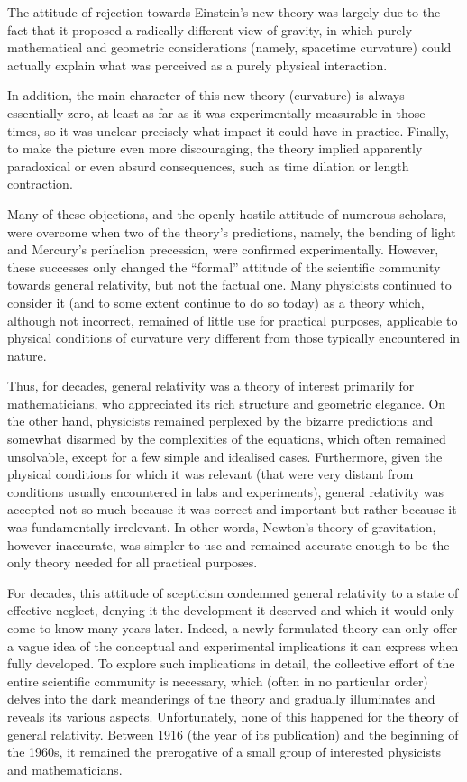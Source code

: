 The attitude of rejection towards Einstein's new theory was largely due to the fact that
it proposed a radically different view of gravity, in which purely mathematical and
geometric considerations (namely, spacetime curvature) could actually explain what was
perceived as a purely physical interaction.

In addition, the main character of this new theory (curvature) is always essentially
zero, at least as far as it was experimentally measurable in those times, so it was
unclear precisely what impact it could have in practice. Finally, to make the picture
even more discouraging, the theory implied apparently paradoxical or even absurd
consequences, such as time dilation or length contraction.

Many of these objections, and the openly hostile attitude of numerous scholars, were
overcome when two of the theory's predictions, namely, the bending of light and
Mercury's perihelion precession, were confirmed experimentally.
However, these successes only changed the ``formal'' attitude of the scientific
community towards general relativity, but not the factual one. Many physicists continued
to consider it (and to some extent continue to do so today) as a theory which, although
not incorrect, remained of little use for practical purposes, applicable to physical
conditions of curvature very different from those typically encountered in nature.

Thus, for decades, general relativity was a theory of interest primarily for
mathematicians, who appreciated its rich structure and geometric elegance. On the other
hand, physicists remained perplexed by the bizarre predictions and somewhat disarmed by
the complexities of the equations, which often remained unsolvable, except for a few
simple and idealised cases. Furthermore, given the physical conditions for which it was
relevant (that were very distant from conditions usually encountered in labs and
experiments), general relativity was accepted not so much because it was correct and
important but rather because it was fundamentally irrelevant. In other words, Newton's
theory of gravitation, however inaccurate, was simpler to use and remained accurate
enough to be the only theory needed for all practical purposes.

For decades, this attitude of scepticism condemned general relativity to a state of
effective neglect, denying it the development it deserved and which it would only come
to know many years later. Indeed, a newly-formulated theory can only offer a vague idea
of the conceptual and experimental implications it can express when fully developed. To
explore such implications in detail, the collective effort of the entire scientific
community is necessary, which (often in no particular order) delves into the dark
meanderings of the theory and gradually illuminates and reveals its various aspects.
Unfortunately, none of this happened for the theory of general relativity. Between 1916
(the year of its publication) and the beginning of the 1960s, it remained the
prerogative of a small group of interested physicists and mathematicians.

